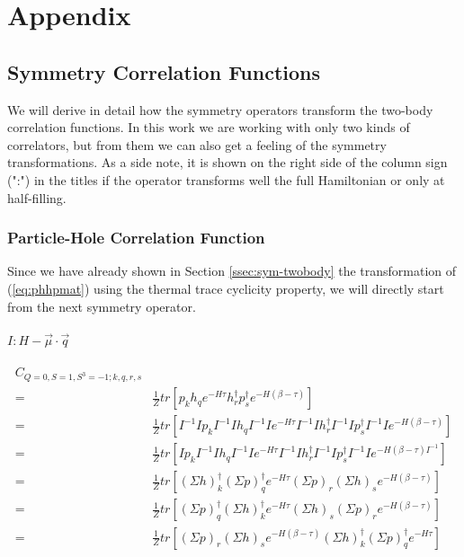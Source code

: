 \chapter{Appendix}
\label{sec:app}

\section{Symmetry Correlation Functions}
We will derive in detail how the symmetry operators transform the two-body correlation functions. In this work we are working with only two kinds of correlators, but from them we can also get a feeling of the symmetry transformations. As a side note, it is shown on the right side of the column sign (":") in the titles if the operator transforms well the full Hamiltonian or only at half-filling.

\subsection{Particle-Hole Correlation Function}

Since we have already shown in Section \ref{ssec:sym-twobody} the transformation of (\ref{eq:phhpmat}) using the thermal trace cyclicity property, we will directly start from the next symmetry operator.

\subsubsection{\underline{$I : H - \vec{\mu}\cdot\vec{q}$}}

\begin{equation}
  \begin{aligned}
    C_{Q=0,S=1,S^3=-1;k,q,r,s} \\
    =& \frac{1}{Z}tr\left[p_kh_qe^{-H\tau}h^\dagger_rp^\dagger_se^{-H\left(\beta-\tau\right)}\right] \\
    =& \frac{1}{Z}tr\left[I^{-1}Ip_kI^{-1}Ih_qI^{-1}Ie^{-H\tau}I^{-1}Ih^\dagger_rI^{-1}Ip^\dagger_sI^{-1}Ie^{-H\left(\beta-\tau\right)}\right] \\
    =& \frac{1}{Z}tr\left[Ip_kI^{-1}Ih_qI^{-1}Ie^{-H\tau}I^{-1}Ih^\dagger_rI^{-1}Ip^\dagger_sI^{-1}Ie^{-H\left(\beta-\tau\right)I^{-1}}\right] \\
    =& \frac{1}{Z}tr\left[(\Sigma h)^\dagger_k(\Sigma p)^\dagger_qe^{-H\tau}(\Sigma p)_r(\Sigma h)_se^{-H\left(\beta-\tau\right)}\right] \\
    =& \frac{1}{Z}tr\left[(\Sigma p)^\dagger_q(\Sigma h)^\dagger_ke^{-H\tau}(\Sigma h)_s(\Sigma p)_re^{-H\left(\beta-\tau\right)}\right] \\
    =& \frac{1}{Z}tr\left[(\Sigma p)_r(\Sigma h)_se^{-H\left(\beta-\tau\right)}(\Sigma h)^\dagger_k(\Sigma p)^\dagger_qe^{-H\tau}\right]
  \end{aligned}
\end{equation}

